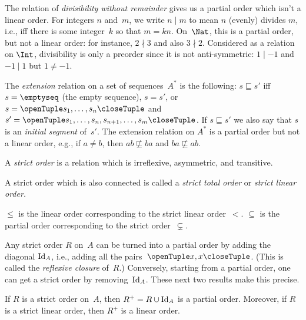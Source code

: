 \documentclass[../../../include/open-logic-section]{subfiles}
\begin{document}
\begin{ex}
The relation of \emph{divisibility without remainder} gives us a
partial order which isn't a linear order. For integers $n$ and~$m$, we
write $n \mid m$ to mean $n$ (evenly) divides $m$, i.e., iff there is
some integer~$k$ so that $m = kn$. On~$\Nat$, this is a partial order,
but not a linear order: for instance, $2 \nmid 3$ and also $3 \nmid
2$. Considered as a relation on $\Int$, divisibility is only a
preorder since it is not anti-symmetric: $1 \mid -1$ and $-1 \mid 1$
but $1 \neq -1$.
\end{ex}

\begin{ex}
The \emph{extension} relation on a set of sequences~$A^*$ is the
following: $s \sqsubseteq s'$ iff $s = \emptyseq$ (the empty
sequence), $s = s'$, or $s = \tuple{s_1, \dots, s_n}$ and $s' =
\tuple{s_1, \dots, s_n, s_{n+1}, \dots, s_m}$. If $s \sqsubseteq s'$
we also say that $s$ is an \emph{initial segment} of~$s'$. The
extension relation on $A^*$ is a partial order but not a linear order,
e.g., if $a \neq b$, then $ab \not\sqsubseteq ba$ and $ba \not\sqsubseteq ab$.
\end{ex}

\begin{defn}
A \emph{strict order} is a relation which is irreflexive, asymmetric,
and transitive.
\end{defn}

\begin{defn}
A strict order which is also connected is called a 
\emph{strict total order} or \emph{strict linear order.}
\end{defn}

\begin{ex}
$\le$ is the linear order corresponding to the strict linear
order~$<$. $\subseteq$ is the partial order corresponding to the
strict order~$\subsetneq$.
\end{ex}

Any strict order $R$ on~$A$ can be turned into a partial order by
adding the diagonal $\mathord{\mathrm{Id}_{A}}$, i.e., adding all the pairs~$\tuple{x,
x}$.  (This is called the \emph{reflexive closure} of~$R$.)
Conversely, starting from a partial order, one can get a strict order
by removing~$\mathord{\mathrm{Id}_{A}}$. These next two results make this precise.

\begin{prop}
If $R$ is a strict order on~$A$, then $R^+ = R \cup \mathord{\mathrm{Id}_{A}}$ is a
partial order. Moreover, if $R$ is a strict linear order, then $R^+$ is 
a linear order.
\end{prop}
\end{document}
